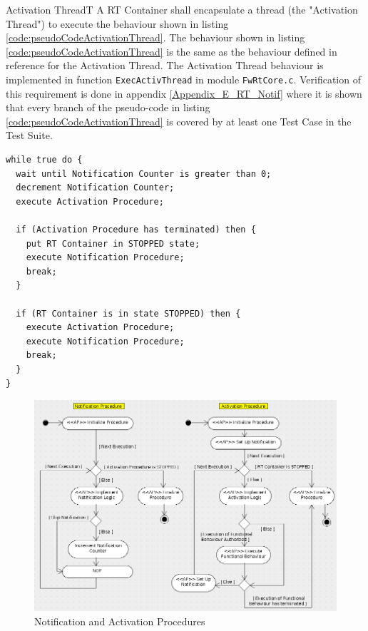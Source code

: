 \documentclass[a4paper,10pt]{article}
\newenvironment{fw_req}[6]
{\addtocounter{subsubsection}{1}
	\hspace{0.2cm}\textbf{FW-\arabic{section}.\arabic{subsection}.\arabic{subsubsection}/#2
	\hspace{0.8cm} #1}
	\vspace{-10pt}
\begin{longtable}{p{2.7cm}P{8.5cm}}
\hline
\textsc{Requirement} & #3 \\
\textsc{Justification} & #4 \\
\textsc{Implementation} & #5  \\ 
\textsc{Verification} & #6  \\
\hline
}
{\end{longtable}}
\begin{document}
\begin{fw_req}{Activation Thread}{T}
{A RT Container shall encapsulate a thread (the "Activation Thread") to execute the behaviour shown in listing \ref{code:pseudoCodeActivationThread}.}
{The behaviour shown in listing \ref{code:pseudoCodeActivationThread} is the same as the behaviour defined in reference \cite{ref:fwprofile} for the Activation Thread. }
{The Activation Thread behaviour is implemented in function \texttt{ExecActivThread} in module \texttt{FwRtCore.c}.} 
{Verification of this requirement is done in appendix \ref{Appendix_E_RT_Notif} where it is shown that every branch of the pseudo-code in listing \ref{code:pseudoCodeActivationThread} is covered by at least one Test Case in the Test Suite.}
\end{fw_req}

\begin{lstlisting}
while true do {
  wait until Notification Counter is greater than 0;
  decrement Notification Counter;
  execute Activation Procedure;
  
  if (Activation Procedure has terminated) then {
    put RT Container in STOPPED state;
    execute Notification Procedure;
    break;
  }

  if (RT Container is in state STOPPED) then {
    execute Activation Procedure;
    execute Notification Procedure;
    break;
  }
}
\end{lstlisting}


\begin{figure}[H]
 \centering
 \includegraphics[scale=0.4,keepaspectratio=true]{../images/RTContainer.png}
 \caption{Notification and Activation Procedures}
 \label{fig:RTContainer}
\end{figure}
\end{document}
